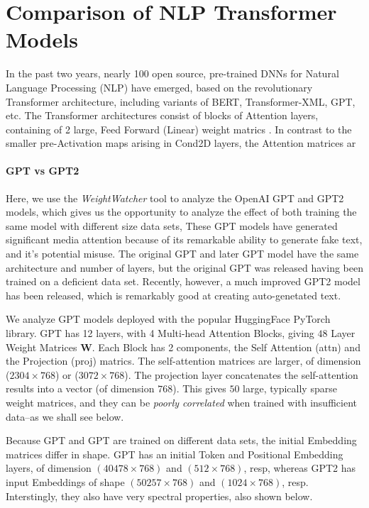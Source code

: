 \section{Comparison of NLP Transformer Models}
\label{sxn:nlp}

In the past two years, nearly 100 open source, pre-trained DNNs for Natural Language Processing (NLP) have emerged,
based on the revolutionary Transformer architecture, including variants of BERT, Transformer-XML, GPT, etc.
The Transformer architectures consist of blocks of Attention layers, containing of 2 large, Feed Forward (Linear)
weight matrics \cite{Attn2017}. In contrast to the smaller pre-Activation maps arising in Cond2D layers,
the Attention matrices ar

\paragraph{GPT vs GPT2}
Here, we use the \emph{WeightWatcher} tool to analyze the OpenAI GPT and GPT2 models, which gives us
the opportunity to analyze the effect of both training the same model with different size data sets,
These GPT models have generated significant media attention because of its remarkable ability to
 generate fake text, and it's potential misuse. 
The original GPT and later GPT model have the same architecture and number of layers, but
the original GPT was released having been trained on a deficient data set.  Recently,
 however, a much improved GPT2 model has been released, which is remarkably good at creating 
auto-genetated text.  

We analyze GPT models deployed with the popular HuggingFace PyTorch library.
GPT has 12 layers, with 4 Multi-head Attention Blocks, giving $48$ Layer Weight Matrices $\mathbf{W}$.
Each Block has 2 components, the Self Attention (attn) and the Projection (proj) matrics.  
The self-attention  matrices are larger, of dimension ($2304\times 768$) or ($3072\times 768$).
The projection layer concatenates the self-attention results into a vector (of dimension $768$).
This gives $50$ large, typically sparse weight matrices, and they can be
 \emph{poorly correlated} when trained with insufficient data--as we shall see below.

Because GPT and GPT are trained on different data sets, the initial Embedding matrices differ in shape.
GPT  has an initial Token and Positional Embedding layers, of dimension
$(40478\times 768)$ and $(512\times 768)$, resp, whereas GPT2 has input Embeddings of shape
$(50257\times 768)$ and $(1024\times 768)$, resp.  Interstingly, they also have very spectral properties,
also shown below.

